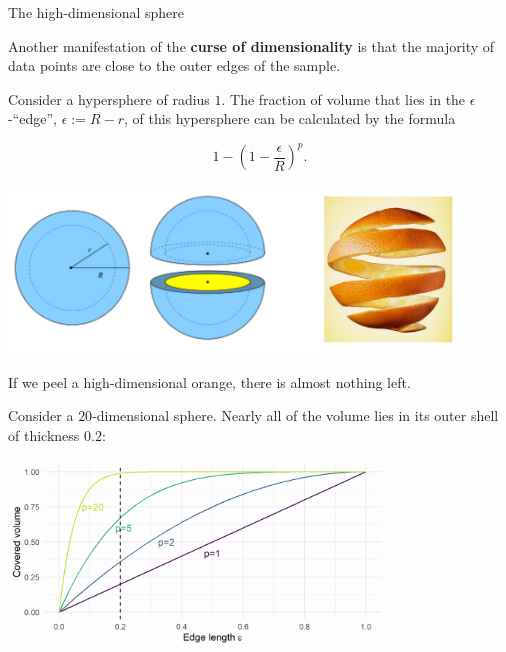 \documentclass[11pt,compress,t,notes=noshow, xcolor=table]{beamer}
\begin{document}
\begin{vbframe}{The high-dimensional sphere}


Another manifestation of the \textbf{curse of dimensionality} is that the majority of data points are close to the outer edges of the sample.
 

Consider a hypersphere of radius $1$. The fraction of volume that lies in the $\epsilon$-\enquote{edge}, $\epsilon := R - r$, of this hypersphere can be calculated by the formula

\vspace*{-0.7cm}

$$
1-\left(1-\frac{\epsilon}{R}\right)^p.
$$

\vspace*{-0.5cm}

\begin{center}
\includegraphics[width=0.9\textwidth]{figure_man/orange.png}
\end{center}

\vspace*{-0.5cm}

If we peel a high-dimensional orange, there is almost nothing left. 

\flushleft


\framebreak

Consider a $20$-dimensional sphere. Nearly all of the volume lies in its outer shell of thickness $0.2$:
\medskip

\vspace*{0.1cm}
\begin{center}
\includegraphics[width = 10cm ]{figure/cursed_dim_fraction_edge_plot.png}
\end{center}

\end{vbframe}
\end{document}
